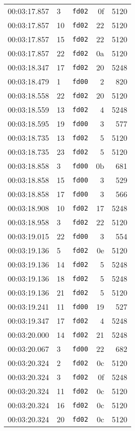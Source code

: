 \documentclass{article}
\begin{document}
\begin{longtable}{lllrr}
00:03:17.857 & 3 & \texttt{fd02} & 0f & 5120 \\
00:03:17.857 & 10 & \texttt{fd02} & 22 & 5120 \\
00:03:17.857 & 15 & \texttt{fd02} & 22 & 5120 \\
00:03:17.857 & 22 & \texttt{fd02} & 0a & 5120 \\
00:03:18.347 & 17 & \texttt{fd02} & 20 & 5248 \\
00:03:18.479 & 1 & \texttt{fd00} & 2 & 820 \\
00:03:18.558 & 22 & \texttt{fd02} & 20 & 5120 \\
00:03:18.559 & 13 & \texttt{fd02} & 4 & 5248 \\
00:03:18.595 & 19 & \texttt{fd00} & 3 & 577 \\
00:03:18.735 & 13 & \texttt{fd02} & 5 & 5120 \\
00:03:18.735 & 23 & \texttt{fd02} & 5 & 5120 \\
00:03:18.858 & 3 & \texttt{fd00} & 0b & 681 \\
00:03:18.858 & 15 & \texttt{fd00} & 3 & 529 \\
00:03:18.858 & 17 & \texttt{fd00} & 3 & 566 \\
00:03:18.908 & 10 & \texttt{fd02} & 17 & 5248 \\
00:03:18.958 & 3 & \texttt{fd02} & 22 & 5120 \\
00:03:19.015 & 22 & \texttt{fd00} & 3 & 554 \\
00:03:19.136 & 5 & \texttt{fd02} & 0e & 5120 \\
00:03:19.136 & 14 & \texttt{fd02} & 5 & 5248 \\
00:03:19.136 & 18 & \texttt{fd02} & 5 & 5248 \\
00:03:19.136 & 21 & \texttt{fd02} & 5 & 5120 \\
00:03:19.241 & 11 & \texttt{fd00} & 19 & 527 \\
00:03:19.347 & 17 & \texttt{fd02} & 4 & 5248 \\
00:03:20.000 & 14 & \texttt{fd02} & 21 & 5248 \\
00:03:20.067 & 3 & \texttt{fd00} & 22 & 682 \\
00:03:20.324 & 2 & \texttt{fd02} & 0c & 5120 \\
00:03:20.324 & 3 & \texttt{fd02} & 0f & 5248 \\
00:03:20.324 & 11 & \texttt{fd02} & 0c & 5120 \\
00:03:20.324 & 16 & \texttt{fd02} & 0c & 5120 \\
00:03:20.324 & 20 & \texttt{fd02} & 0c & 5120 \\

\end{longtable}
\end{document}
